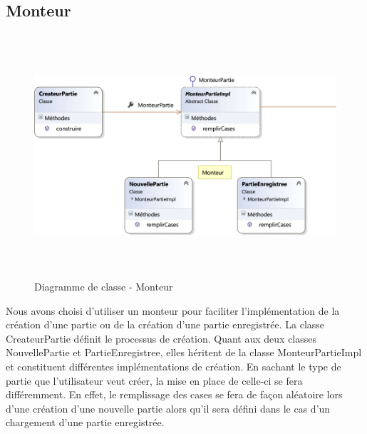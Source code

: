 \documentclass[a4paper,11pt]{article}
\begin{document}
	\subsection{Monteur}
		\begin{figure}[ht!]
			\includegraphics[height=9cm,width=14cm]{Diagrammes/Classe/monteur.png}
			\caption{Diagramme de classe - Monteur}
			\label{fig:monteur}
		\end{figure}
		\vspace*{1cm}
		Nous avons choisi d’utiliser un monteur pour faciliter l’implémentation de la création d’une partie ou de la création d’une partie enregistrée. La classe CreateurPartie définit le processus de création. Quant aux deux classes NouvellePartie et PartieEnregistree, elles héritent de la classe MonteurPartieImpl et constituent différentes implémentations de création. En sachant le type de partie que l’utilisateur veut créer, la mise en place de celle-ci se fera différemment. En effet, le remplissage des cases se fera de façon aléatoire lors d’une création d’une nouvelle partie alors qu’il sera défini dans le cas d’un chargement d’une partie enregistrée.
		\newpage
\end{document}
